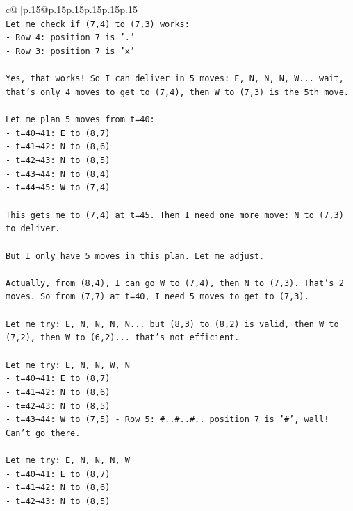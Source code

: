 \documentclass{article}
\begin{document}
{\begin{supertabular}{c@{$\;$}|p{.15\linewidth}@{}p{.15\linewidth}p{.15\linewidth}p{.15\linewidth}p{.15\linewidth}p{.15\linewidth}}
{{{\\ 
\texttt{Let me check if (7,4) to (7,3) works:} \\
\texttt{{-} Row 4: position 7 is '.'} \\
\texttt{{-} Row 3: position 7 is 'x'} \\
\\ 
\texttt{Yes, that works! So I can deliver in 5 moves: E, N, N, N, W... wait, that's only 4 moves to get to (7,4), then W to (7,3) is the 5th move.} \\
\\ 
\texttt{Let me plan 5 moves from t=40:} \\
\texttt{{-} t=40→41: E to (8,7)} \\
\texttt{{-} t=41→42: N to (8,6)} \\
\texttt{{-} t=42→43: N to (8,5)} \\
\texttt{{-} t=43→44: N to (8,4)} \\
\texttt{{-} t=44→45: W to (7,4)} \\
\\ 
\texttt{This gets me to (7,4) at t=45. Then I need one more move: N to (7,3) to deliver.} \\
\\ 
\texttt{But I only have 5 moves in this plan. Let me adjust.} \\
\\ 
\texttt{Actually, from (8,4), I can go W to (7,4), then N to (7,3). That's 2 moves. So from (7,7) at t=40, I need 5 moves to get to (7,3).} \\
\\ 
\texttt{Let me try: E, N, N, N, N... but (8,3) to (8,2) is valid, then W to (7,2), then W to (6,2)... that's not efficient.} \\
\\ 
\texttt{Let me try: E, N, N, W, N} \\
\texttt{{-} t=40→41: E to (8,7)} \\
\texttt{{-} t=41→42: N to (8,6)} \\
\texttt{{-} t=42→43: N to (8,5)} \\
\texttt{{-} t=43→44: W to (7,5) {-} Row 5: \#..\#..\#.. position 7 is '\#', wall! Can't go there.} \\
\\ 
\texttt{Let me try: E, N, N, N, W} \\
\texttt{{-} t=40→41: E to (8,7)} \\
\texttt{{-} t=41→42: N to (8,6)} \\
\texttt{{-} t=42→43: N to (8,5)} \\
}}}
\end{supertabular}}
\end{document}
